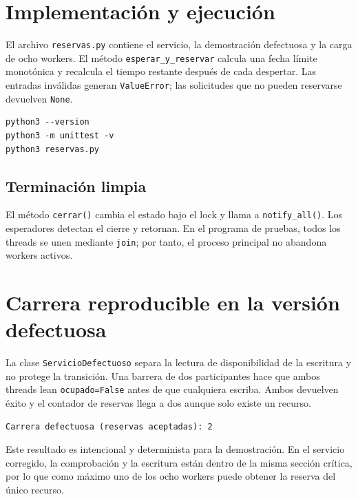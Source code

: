 \documentclass[12pt,a4paper]{article}
\begin{document}
\section{Implementación y ejecución}
El archivo \texttt{reservas.py} contiene el servicio, la demostración defectuosa y la carga de ocho workers. El método \texttt{esperar\_y\_reservar} calcula una fecha límite monotónica y recalcula el tiempo restante después de cada despertar. Las entradas inválidas generan \texttt{ValueError}; las solicitudes que no pueden reservarse devuelven \texttt{None}.
\begin{lstlisting}[style=console]
python3 --version
python3 -m unittest -v
python3 reservas.py
\end{lstlisting}
\subsection{Terminación limpia}
El método \texttt{cerrar()} cambia el estado bajo el lock y llama a \texttt{notify\_all()}. Los esperadores detectan el cierre y retornan. En el programa de pruebas, todos los threads se unen mediante \texttt{join}; por tanto, el proceso principal no abandona workers activos.
\section{Carrera reproducible en la versión defectuosa}
La clase \texttt{ServicioDefectuoso} separa la lectura de disponibilidad de la escritura y no protege la transición. Una barrera de dos participantes hace que ambos threads lean \texttt{ocupado=False} antes de que cualquiera escriba. Ambos devuelven éxito y el contador de reservas llega a dos aunque solo existe un recurso.
\begin{lstlisting}[style=console]
Carrera defectuosa (reservas aceptadas): 2
\end{lstlisting}
Este resultado es intencional y determinista para la demostración. En el servicio corregido, la comprobación y la escritura están dentro de la misma sección crítica, por lo que como máximo uno de los ocho workers puede obtener la reserva del único recurso.
\end{document}
